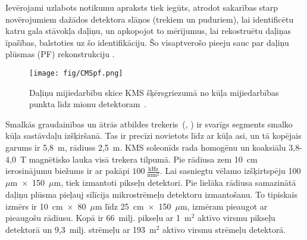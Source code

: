 Ievērojami uzlabots notikumu apraksts tiek iegūts, atrodot sakarības starp novērojumiem dažādos detektora slāņos (trekiem un puduriem), lai identificētu katru \gls{gala stāvokļa} daļiņu, un apkopojot to mērījumus, lai rekostruētu daļiņas īpašības, balstoties uz šo identifikāciju. Šo visaptverošo pieeju sauc par \gls{daļiņu plūsmas} (PF) rekonstrukciju \cite{Sirunyan:2017ulk}.

\begin{figure}[h]
  \centering
  \texttt{[image: fig/CMSpf.png]}
  \caption{Daļiņu mijiedarbību skice KMS šķērsgriezumā no kūļa mijiedarbības punkta līdz mionu detektoram~\cite{Sirunyan:2017ulk}.}
  \label{fig:CMSpf}
\end{figure}

Smalkās \gls{graudainības} un ātrās atbildes trekeris~(\cite{Karimaki:368412}, \cite{tracker_addendum}) ir svarīgs segments smalko kūļa sastāvdaļu izšķiršanā. Tas ir precīzi novietots līdz ar kūļa asi, un tā kopējais garums ir 5,8~m, rādiuss 2,5~m. KMS soleonīds rada homogēnu un koaksiālu 3,8-4,0~T magnētisko lauka visā trekera tilpumā. Pie rādiusa zem 10~cm ierosinājumu biežums ir ar pakāpi $100~\frac{\text{kHz}}{\text{mm}^2}$. Lai sasniegtu vēlamo izšķirtspēju 100~$\mu$m~$\times$~150~$\mu$m, tiek izmantoti pikseļu detektori. Pie lielāka rādiusa samazinātā daļiņu plūsma pieļauj silīcija mikrostrēmeļu detektoru izmantošanu. To tipiskais izmērs ir 10~cm~$\times$~80~$\mu$m līdz 25~cm~$\times$~150~$\mu$m, izmēram pieaugot ar pieaugošu rādiusu. Kopā ir 66~milj. pikseļu ar 1~$\text{m}^2$ aktīvo virsmu pikseļu detektorā un 9,3~milj. strēmeļu ar 193~m${}^2$ aktīvo virsmu strēmeļu detektorā.

